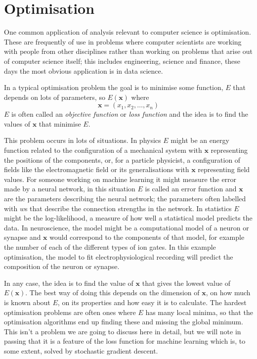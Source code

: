 \documentclass[12pt]{article}
\begin{document}
\section*{Optimisation}
One common application of analysis relevant to computer science is
optimisation. These are frequently of use in problems where computer
scientists are working with people from other disciplines rather than
working on problems that arise out of computer science itself; this
includes engineering, science and finance, these days the most obvious
application is in data science.


In a typical optimisation problem the goal is to minimise some
function, $E$ that depends on lots of parameters, so $E(\mathbf{x})$ where
\begin{equation}
\mathbf{x}=(x_1,x_2,\ldots,x_n)
\end{equation}
$E$ is often called an \textsl{objective function} or \textsl{loss
  function} and the idea is to find the values of $\mathbf{x}$ that
minimise $E$.

This problem occurs in lots of situations. In physics $E$ might
be an energy function related to the configuration of a mechanical
system with $\mathbf{x}$ representing the positions of the components,
or, for a particle physicist, a configuration of fields like the
electromagnetic field or its generalisations with $\mathbf{x}$
representing field values. For someone working on machine learning it
might measure the error made by a neural network, in this situation
$E$ is called an error function and $\mathbf{x}$ are the parameters
describing the neural network; the parameters often labelled with $w$s
that describe the connection strengths in the network. In statistics
$E$ might be the log-likelihood, a measure of how well a statistical
model predicts the data. In neuroscience, the model might be a
computational model of a neuron or synapse and $\mathbf{x}$ would
correspond to the components of that model, for example the number of
each of the different types of ion gates. In this example optimisation,
the model to fit electrophysiological recording will predict the
composition of the neuron or synapse.

In any case, the idea is to find the value of $\mathbf{x}$ that gives
the lowest value of $E(\mathbf{x})$. The best way of doing this
depends on the dimension of $\mathbf{x}$, on how much is known about
$E$, on its properties and how easy it is to calculate. The hardest
optimisation problems are often ones where $E$ has many local minima, so that the optimisation algorithms end up finding these and missing the
global minimum. This isn't a problem we are going to discuss here in
detail, but we will note in passing that it is a feature of the loss
function for machine learning which is, to some extent, solved by
stochastic gradient descent.
\end{document}
